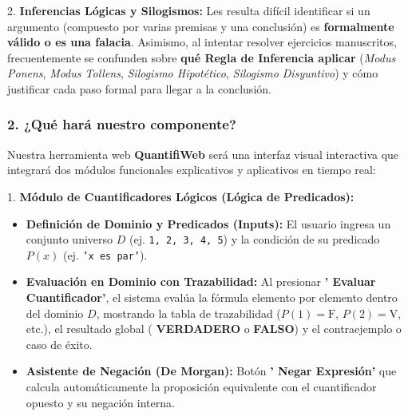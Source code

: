 \documentclass[11pt,a4paper,openany]{book}
\begin{document}
2. \textbf{Inferencias Lógicas y Silogismos:}
   Les resulta difícil identificar si un argumento (compuesto por varias premisas y una conclusión) es \textbf{formalmente válido o es una falacia}. Asimismo, al intentar resolver ejercicios manuscritos, frecuentemente se confunden sobre \textbf{qué Regla de Inferencia aplicar} (\textit{Modus Ponens}, \textit{Modus Tollens}, \textit{Silogismo Hipotético}, \textit{Silogismo Disyuntivo}) y cómo justificar cada paso formal para llegar a la conclusión.

\hrulefill

\subsubsection{2. ¿Qué hará nuestro componente?}
Nuestra herramienta web \textbf{QuantifiWeb} será una interfaz visual interactiva que integrará dos módulos funcionales explicativos y aplicativos en tiempo real:

1. \textbf{Módulo de Cuantificadores Lógicos (Lógica de Predicados):}
\begin{itemize}[leftmargin=*]
\item \textbf{Definición de Dominio y Predicados (Inputs):} El usuario ingresa un conjunto universo $D$ (ej. \texttt{1, 2, 3, 4, 5}) y la condición de su predicado $P(x)$ (ej. \texttt{'x es par'}).
\item \textbf{Evaluación en Dominio con Trazabilidad:} Al presionar \textbf{' Evaluar Cuantificador'}, el sistema evalúa la fórmula elemento por elemento dentro del dominio $D$, mostrando la tabla de trazabilidad ($P(1)=\text{F}$, $P(2)=\text{V}$, etc.), el resultado global ( \textbf{VERDADERO} o  \textbf{FALSO}) y el contraejemplo o caso de éxito.
\item \textbf{Asistente de Negación (De Morgan):} Botón \textbf{' Negar Expresión'} que calcula automáticamente la proposición equivalente con el cuantificador opuesto y su negación interna.
\end{itemize}
\end{document}
